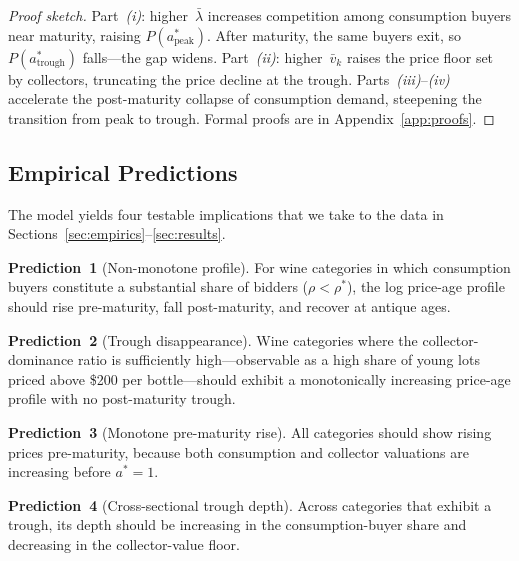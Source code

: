 \begin{proof}[Proof sketch]
Part~\emph{(i)}: higher~$\bar{\lambda}$ increases competition among
consumption buyers near maturity, raising
$P(a^{*}_{\mathrm{peak}})$.  After maturity, the same buyers exit,
so $P(a^{*}_{\mathrm{trough}})$ falls---the gap widens.
Part~\emph{(ii)}: higher~$\bar{v}_{k}$ raises the price floor set
by collectors, truncating the price decline at the trough.
Parts~\emph{(iii)}--\emph{(iv)} accelerate the post-maturity
collapse of consumption demand, steepening the transition from peak
to trough.
Formal proofs are in Appendix~\ref{app:proofs}.
\end{proof}


\subsection{Empirical Predictions}
\label{sec:model:predictions}

The model yields four testable implications that we take to the data
in Sections~\ref{sec:empirics}--\ref{sec:results}.

\medskip

\noindent\textbf{Prediction~1} (Non-monotone profile).
For wine categories in which consumption buyers constitute a
substantial share of bidders ($\rho < \rho^{*}$), the log price-age
profile should rise pre-maturity, fall post-maturity, and recover at
antique ages.

\medskip

\noindent\textbf{Prediction~2} (Trough disappearance).
Wine categories where the collector-dominance ratio is sufficiently
high---observable as a high share of young lots priced above \$200
per bottle---should exhibit a monotonically increasing price-age
profile with no post-maturity trough.

\medskip

\noindent\textbf{Prediction~3} (Monotone pre-maturity rise).
All categories should show rising prices pre-maturity, because both
consumption and collector valuations are increasing before $a^{*}=1$.

\medskip

\noindent\textbf{Prediction~4} (Cross-sectional trough depth).
Across categories that exhibit a trough, its depth should be
increasing in the consumption-buyer share and decreasing in the
collector-value floor.


